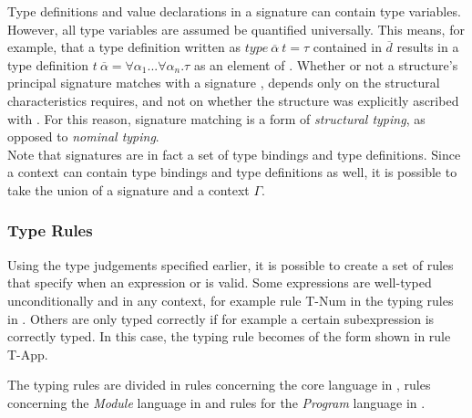 Type definitions and value declarations in a signature can contain type variables.
However, all type variables are assumed be quantified universally.
This means, for example, that a type definition written as $type\ \overline{\alpha}\ t = \tau$ contained in $\overline{d}$ results in a type definition $t\ \overline{\alpha} = \forall \alpha_{1}...\forall \alpha_{n}.\tau$ as an element of .
Whether or not a structure's principal signature matches with a signature , depends only on the structural characteristics  requires, and not on whether the structure was explicitly ascribed with .
For this reason, signature matching is a form of \emph{structural typing}, as opposed to \emph{nominal typing}.
\\[1em]
Note that signatures are in fact a set of type bindings and type definitions.
Since a context can contain type bindings and type definitions as well, it is possible to take the union of a signature and a context $\Gamma$.


\subsubsection{Type Rules}
Using the type judgements specified earlier, it is possible to create a set of rules that specify when an expression  or  is valid.
Some expressions are well-typed unconditionally and in any context, for example rule T-Num in the typing rules in .
Others are only typed correctly if for example a certain subexpression is correctly typed. In this case, the typing rule becomes of the form shown in rule T-App.

The typing rules are divided in rules concerning the core language in , rules concerning the \emph{Module} language in  and rules for the \emph{Program} language in .


\clearpage
